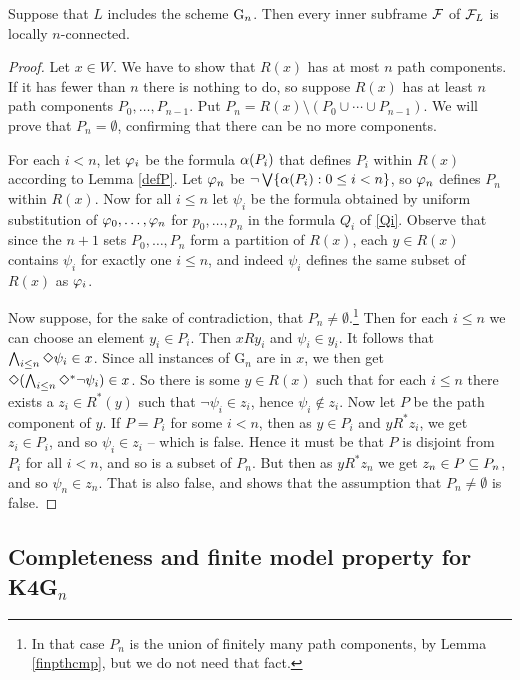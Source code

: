 \begin{theorem}\label{canlnc}
Suppose that $L$ includes the scheme $\mathrm{G}_n$.
Then every inner subframe $\mathcal{F}$ of $\mathcal{F}_L$ is locally $n$-connected.
\end{theorem}
\begin{proof} 
Let $x\in W$. We have to show that $R(x)$ has at most $n$ path components. If it has fewer than $n$ there is nothing to do, so suppose  $R(x)$ has at least  $n$ path components $P_0,\dots,P_{n-1}$. Put 
$P_n=  R(x)\setminus (P_0\cup\cdots\cup P_{n-1})$. We will prove that $P_n=\emptyset$, confirming that there can be no more components.

For each $i< n$, let $\varphi_i$ be the formula $\alpha(P_i)$ that defines $P_i$ within $R(x)$ according to Lemma \ref{defP}.  Let 
 $\varphi_n$ be $\neg\bigvee\{\alpha(P_i):0\leq i< n\}$, so $\varphi_n$ defines $P_n$ within $R(x)$. Now for all $i\leq n$ let $\psi_i$ be the formula obtained by uniform substitution of 
$\varphi_0,\dots,\varphi_n$ for $p_0, \dots,p_n$ in the formula $Q_i$ of \eqref{Qi}. Observe that since the $n+1$ sets 
$P_0,\dots,P_n$ form a partition of $R(x)$, each $y\in R(x)$ contains $\psi_i$ for exactly one $i\leq n$, and indeed $\psi_i$ defines the same subset of $R(x)$ as  $\varphi_i$.

Now suppose, for the sake of contradiction, that $P_n\ne\emptyset$.\footnote{In that case $P_n$ is the union of finitely many path components, by Lemma \ref{finpthcmp}, but we do not need that fact.}
Then for each $i\leq n$ we can choose an element $y_i\in P_i$. Then $xRy_i$ and $\psi_i\in y_i$.
It follows that
$\bigwedge_{i\leq n}\Diamond \psi_i\in x$. Since all instances of G$_n$ are in $x$, we then get 
$\Diamond(\bigwedge_{i\leq n}\Diamond^* \neg \psi_i )\in x$. So there is some $y\in R(x)$ such that for each $i\leq n$ there exists a $z_i\in R^*(y)$ such that   $\neg\psi_i\in z_i$, hence $\psi_i\notin z_i$. Now let $P$ be the path component of $y$. If $P=P_i$ for some    $i<n$, then as $y\in P_i$ and  $yR^*z_i$, we get $z_i\in P_i$,  and so $\psi_i\in z_i$ -- which is false. Hence it must be 
that $P$ is disjoint from $P_i$ for all $i<n$, and so is a subset of $P_n$.
But then as $yR^*z_n$ we get $z_n\in P\subseteq P_n$, and so $\psi_n\in z_n$.
That is also false, and shows that the assumption that $P_n\ne\emptyset$ is false.
\end{proof}

\subsection{Completeness and finite model property for K4G$_n$}\label{sec:fmp Gn}

